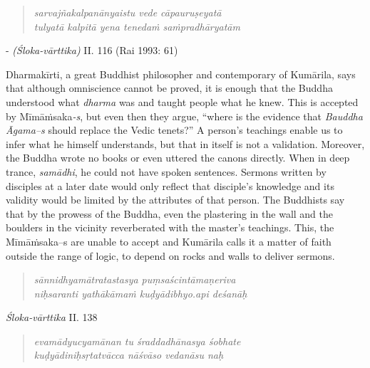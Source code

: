 \vspace{-.3cm}

\begin{verse}
\textit{sarvajñakalpanānyaistu vede cāpauruṣeyatā }\\\textit{tulyatā kalpitā yena tenedaṁ saṁpradhāryatām } 
\end{verse}

\vspace{-.4cm}

\begin{flushright}
- \textit{(Śloka-vārttika)} II. 116 (Rai 1993: 61)
\end{flushright}

Dharmakīrti, a great Buddhist philosopher and contemporary of Kumārila, says that although omniscience cannot be proved, it is enough that the Buddha understood what \textit{dharma} was and taught people what he knew. This is accepted by Mīmāṁsaka\textit{-s}, but even then they argue, “where is the evidence that \textit{Bauddha Āgama--s} should replace the Vedic tenets?” A person’s teachings enable us to infer what he himself understands, but that in itself is not a validation. Moreover, the Buddha wrote no books or even uttered the canons directly. When in deep trance, \textit{samādhi}, he could not have spoken sentences. Sermons written by disciples at a later date would only reflect that disciple’s knowledge and its validity would be limited by the attributes of that person. The Buddhists say that by the prowess of the Buddha, even the plastering in the wall and the boulders in the vicinity reverberated with the master’s teachings. This, the Mīmāṁsaka--s are unable to accept and Kumārila calls it a matter of faith outside the range of logic, to depend on rocks and walls to deliver sermons.

\begin{verse}
\textit{sānnidhyamātratastasya puṃsaścintāmaṇeriva }\\
\textit{niḥsaranti yathākāmaṁ kuḍyādibhyo.api deśanāḥ }
\end{verse}

\vspace{-0.5cm} 
\begin{flushright}
 \textit{Śloka-vārttika} II. 138
 \end{flushright}
 
  \begin{verse}
 \textit{evamādyucyamānan tu śraddadhānasya śobhate }\\
 \textit{kuḍyādiniḥsṛtatvācca nāśvāso vedanāsu naḥ }
 \end{verse}
 
